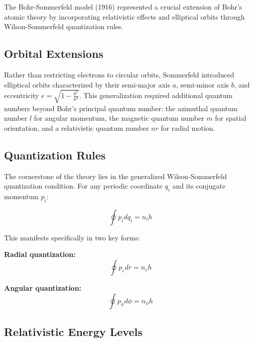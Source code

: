 \documentclass[
  a4paper,
]{book}
\begin{document}
\begin{tcolorbox}[enhanced jigsaw, coltitle=black, title=\textcolor{quarto-callout-note-color}{\faInfo}\hspace{0.5em}{The Bohr-Sommerfeld Model: A Quantum Mechanical Bridge}, colframe=quarto-callout-note-color-frame, toprule=.15mm, opacitybacktitle=0.6, left=2mm, opacityback=0, breakable, toptitle=1mm, bottomtitle=1mm, leftrule=.75mm, arc=.35mm, titlerule=0mm, colbacktitle=quarto-callout-note-color!10!white, rightrule=.15mm, bottomrule=.15mm, colback=white]

The Bohr-Sommerfeld model (1916) represented a crucial extension of
Bohr's atomic theory by incorporating relativistic effects and
elliptical orbits through Wilson-Sommerfeld quantization rules.

\subsection{Orbital Extensions}\label{orbital-extensions}

Rather than restricting electrons to circular orbits, Sommerfeld
introduced elliptical orbits characterized by their semi-major axis
\(a\), semi-minor axis \(b\), and eccentricity
\(e = \sqrt{1-\frac{b^2}{a^2}}\). This generalization required
additional quantum numbers beyond Bohr's principal quantum number: the
azimuthal quantum number \(l\) for angular momentum, the magnetic
quantum number \(m\) for spatial orientation, and a relativistic quantum
number \(nr\) for radial motion.

\subsection{Quantization Rules}\label{quantization-rules}

The cornerstone of the theory lies in the generalized Wilson-Sommerfeld
quantization condition. For any periodic coordinate \(q_i\) and its
conjugate momentum \(p_i\):

\[\oint p_i dq_i = n_ih\]

This manifests specifically in two key forms:

\textbf{Radial quantization:} \[\oint p_r dr = n_rh\]

\textbf{Angular quantization:} \[\oint p_\phi d\phi = n_\phi h\]

\subsection{Relativistic Energy
Levels}\label{relativistic-energy-levels}


\end{tcolorbox}
\end{document}
